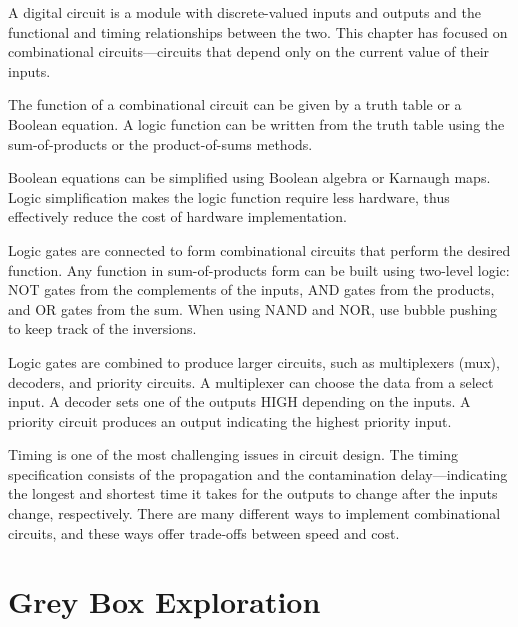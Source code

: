 \documentclass[12pt]{article}
\begin{document}
A digital circuit is a module with discrete-valued inputs and outputs and the functional and timing relationships between the two. This chapter has focused on combinational circuits---circuits that depend only on the current value of their inputs.

The function of a combinational circuit can be given by a truth table or a Boolean equation. A logic function can be written from the truth table using the sum-of-products or the product-of-sums methods.

Boolean equations can be simplified using Boolean algebra or Karnaugh maps. Logic simplification makes the logic function require less hardware, thus effectively reduce the cost of hardware implementation.

Logic gates are connected to form combinational circuits that perform the desired function. Any function in sum-of-products form can be built using two-level logic: NOT gates from the complements of the inputs, AND gates from the products, and OR gates from the sum. When using NAND and NOR, use bubble pushing to keep track of the inversions.

Logic gates are combined to produce larger circuits, such as multiplexers (mux), decoders, and priority circuits. A multiplexer can choose the data from a select input. A decoder sets one of the outputs HIGH depending on the inputs. A priority circuit produces an output indicating the highest priority input.

Timing is one of the most challenging issues in circuit design. The timing specification consists of the propagation and the contamination delay---indicating the longest and shortest time it takes for the outputs to change after the inputs change, respectively. There are many different ways to implement combinational circuits, and these ways offer trade-offs between speed and cost.

\section{Grey Box Exploration}
\end{document}
